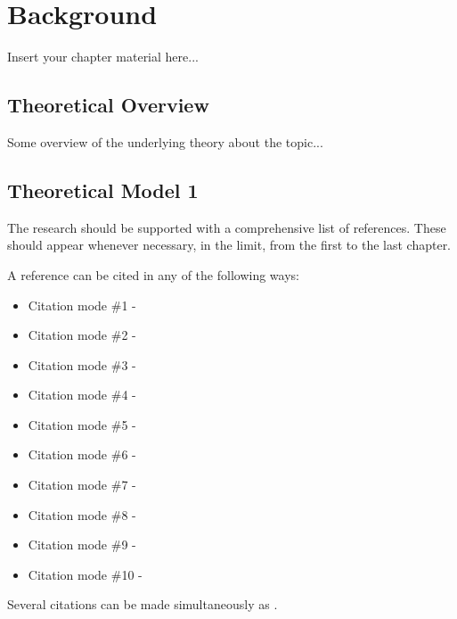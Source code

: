 \chapter{Background}
\label{chapter:background}

Insert your chapter material here...


\section{Theoretical Overview}
\label{section:overview}

Some overview of the underlying theory about the topic...


\section{Theoretical Model 1}
\label{section:theory1}

The research should be supported with a comprehensive list of references.
These should appear whenever necessary, in the limit, from the first to the last chapter.

A reference can be cited in any of the following ways:
%
\begin{itemize}
  \item Citation mode \#1 - \quad \cite{jameson:adjointns}
  \item Citation mode \#2 - \quad \citet{jameson:adjointns}
  \item Citation mode \#3 - \quad \citep{jameson:adjointns}
  \item Citation mode \#4 - \quad \citet*{jameson:adjointns}
  \item Citation mode \#5 - \quad \citep*{jameson:adjointns}
  \item Citation mode \#6 - \quad \citealt{jameson:adjointns}
  \item Citation mode \#7 - \quad \citealp{jameson:adjointns}
  \item Citation mode \#8 - \quad \citeauthor{jameson:adjointns}
  \item Citation mode \#9 - \quad \citeyear{jameson:adjointns}
  \item Citation mode \#10 - \quad \citeyearpar{jameson:adjointns}
\end{itemize}
%
Several citations can be made simultaneously as \citep{nocedal:opt,marta:ijcfd}. \\

